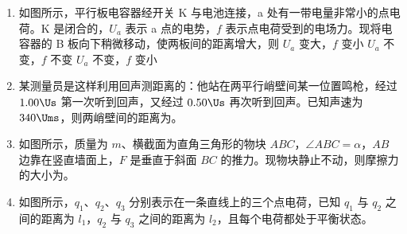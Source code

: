 \documentclass[\gkver]{gaokaozhenti}
\begin{document}
\begin{enumerate}
\item
如图所示，平行板电容器经开关 K 与电池连接，a 处有一带电量非常小的点电荷。K 是闭合的，$U_{a}$ 表示 a 点的电势，$f$ 表示点电荷受到的电场力。现将电容器的 B 板向下稍微移动，使两板间的距离增大，则
{$U_{a}$ 变大，$f$ 变小}
{$U_{a}$ 不变，$f$ 不变}
{$U_{a}$ 不变，$f$ 变小}

\item
某测量员是这样利用回声测距离的：他站在两平行峭壁间某一位置鸣枪，经过 $1.00\Us$ 第一次听到回声，又经过 $0.50\Us$ 再次听到回声。已知声速为 $340\Ums$，则两峭壁间的距离为\tkanswer[2.6cm]{$425\Um$}。

\item
如图所示，质量为 $m$、横截面为直角三角形的物块 $ABC$，$\angle ABC=\alpha$，$AB$ 边靠在竖直墙面上，$F$ 是垂直于斜面 $BC$ 的推力。现物块静止不动，则摩擦力的大小为。
\onepicture[align=right, h=3.60cm]{}

\item
如图所示，$q_{1}$、$q_{2}$、$q_{3}$ 分别表示在一条直线上的三个点电荷，已知 $q_{1}$ 与 $q_{2}$ 之间的距离为 $l_{1}$，$q_{2}$ 与 $q_{3}$ 之间的距离为 $l_{2}$，且每个电荷都处于平衡状态。


\end{enumerate}
\end{document}
